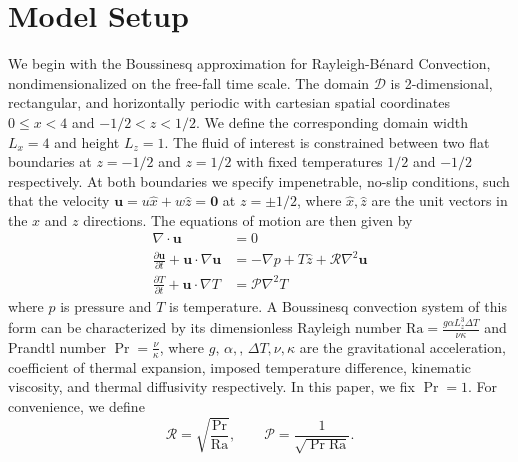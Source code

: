 \documentclass[reprint,amsmath,amssymb,aps,nofootinbib]{revtex4-1}
\newcommand\Ra{\mathrm{Ra}}
\renewcommand{\vec}[1]{\boldsymbol{#1}}
\begin{document}
\section{Model Setup}\label{sec:model}
We begin with the Boussinesq approximation for Rayleigh-Bénard Convection, nondimensionalized on the free-fall time scale. 
The domain $\mathcal{D}$ is 2-dimensional, rectangular, and horizontally periodic with cartesian spatial coordinates $0 \leq x < 4$ and $-1/2 < z < 1/2$.
We define the corresponding domain width $L_x = 4$ and height  $L_z = 1$.
The fluid of interest is constrained between two flat boundaries at $z = -1/2$ and $z = 1/2$ with fixed temperatures $1/2$ and $-1/2$ respectively. 
At both boundaries we specify impenetrable, no-slip conditions, such that the velocity $\vec{u} = u \hat{x} + w \hat{z} = \vec{0}$ at $z = \pm 1/2$, where $\hat{x}, \hat{z}$ are the unit vectors in the $x$ and $z$ directions. 
The equations of motion are then given by
\begin{align}
    \nabla \cdot \vec{u} &= 0 \label{EQ:motion1}\\
    \frac{\partial \vec{u}}{\partial t} + \vec{u} \cdot \nabla \vec{u} &= - \nabla p + T \hat{z} + \mathcal{R} \nabla^2 \vec{u} \label{EQ:motion2}\\
    \frac{\partial T}{\partial t} + \vec{u} \cdot \nabla T &= \mathcal{P} \nabla^2 T \label{EQ:motion3}
\end{align}
where $p$ is pressure and $T$ is temperature. 
A Boussinesq convection system of this form can be characterized by its dimensionless Rayleigh number $\Ra = \frac{g\alpha L^3_z \Delta T}{\nu \kappa}$ and Prandtl number $\Pr = \frac{\nu}{\kappa}$, where $g, \, \alpha,, \, \Delta T, \nu, \kappa$ are the gravitational acceleration, coefficient of thermal expansion, imposed temperature difference, kinematic viscosity, and thermal diffusivity respectively. 
In this paper, we fix $\Pr = 1$.
For convenience, we define
\begin{equation}
\mathcal{R} = \sqrt{\frac{\Pr}{\Ra}}, \qquad \mathcal{P} = \frac{1}{\sqrt{\Pr \Ra}}.
\end{equation}
\end{document}
